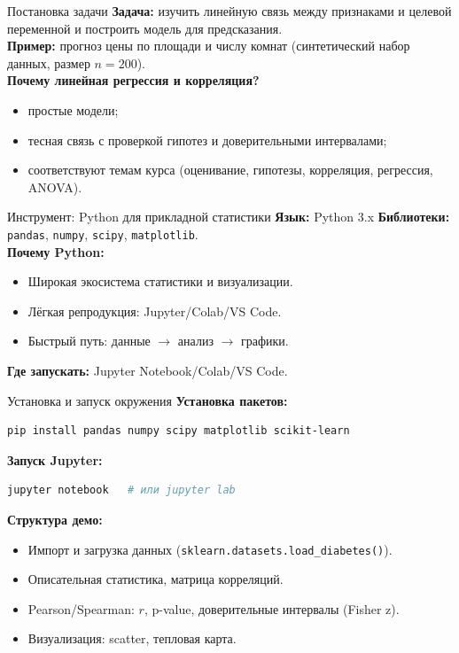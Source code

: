 \documentclass{beamer}
\begin{document}
\begin{frame}{Постановка задачи}
\textbf{Задача:} изучить линейную связь между признаками и целевой переменной и построить модель для предсказания.\\[6pt]
\textbf{Пример:} прогноз цены по площади и числу комнат (синтетический набор данных, размер $n=200$).\\[6pt]
\textbf{Почему линейная регрессия и корреляция?}
\begin{itemize}
  \item простые модели;
  \item тесная связь с проверкой гипотез и доверительными интервалами;
  \item соответствуют темам курса (оценивание, гипотезы, корреляция, регрессия, ANOVA).
\end{itemize}
\end{frame}



\begin{frame}{Инструмент: Python для прикладной статистики}
\textbf{Язык:} Python 3.x \quad \textbf{Библиотеки:} \texttt{pandas}, \texttt{numpy}, \texttt{scipy}, \texttt{matplotlib}.\\[4pt]
\textbf{Почему Python:}
\begin{itemize}
  \item Широкая экосистема статистики и визуализации.
  \item Лёгкая репродукция: Jupyter/Colab/VS Code.
  \item Быстрый путь: данные $\rightarrow$ анализ $\rightarrow$ графики.
\end{itemize}
\textbf{Где запускать:} Jupyter Notebook/Colab/VS Code.
\end{frame}


\begin{frame}[fragile]{Установка и запуск окружения}
\textbf{Установка пакетов:}
\begin{lstlisting}[language=bash]
pip install pandas numpy scipy matplotlib scikit-learn
\end{lstlisting}
\textbf{Запуск Jupyter:}
\begin{lstlisting}[language=bash]
jupyter notebook   # или jupyter lab
\end{lstlisting}
\textbf{Структура демо:}
\begin{itemize}
  \item Импорт и загрузка данных (\texttt{sklearn.datasets.load\_diabetes()}).
  \item Описательная статистика, матрица корреляций.
  \item Pearson/Spearman: $r$, p-value, доверительные интервалы (Fisher z).
  \item Визуализация: scatter, тепловая карта.
\end{itemize}
\end{frame}
\end{document}
